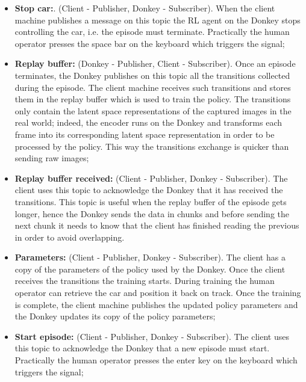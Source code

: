 \begin{itemize}
    \item \textbf{Stop car:}. (Client - Publisher, Donkey - Subscriber). When the client machine publishes a message on this topic the RL agent on the Donkey stops controlling the car, i.e. the episode must terminate. Practically the human operator presses the space bar on the keyboard which triggers the signal;
    \item \textbf{Replay buffer:} (Donkey - Publisher, Client - Subscriber). Once an episode terminates, the Donkey publishes on this topic all the transitions collected during the episode. The client machine receives such transitions and stores them in the replay buffer which is used to train the policy. The transitions only contain the latent space representations of the captured images in the real world; indeed, the encoder runs on the Donkey and transforms each frame into its corresponding latent space representation in order to be processed by the policy. This way the transitions exchange is quicker than sending raw images;
    \item \textbf{Replay buffer received:} (Client - Publisher, Donkey - Subscriber). The client uses this topic to acknowledge the Donkey that it has received the transitions. This topic is useful when the replay buffer of the episode gets longer, hence the Donkey sends the data in chunks and before sending the next chunk it needs to know that the client has finished reading the previous in order to avoid overlapping. 
    \item \textbf{Parameters:} (Client - Publisher, Donkey - Subscriber). The client has a copy of the parameters of the policy used by the Donkey. Once the client receives the transitions the training starts. During training the human operator can retrieve the car and position it back on track. Once the training is complete, the client machine publishes the updated policy parameters and the Donkey updates its copy of the policy parameters;
    \item \textbf{Start episode:} (Client - Publisher, Donkey - Subscriber). The client uses this topic to acknowledge the Donkey that a new episode must start. Practically the human operator presses the enter key on the keyboard which triggers the signal;
\end{itemize}
%

